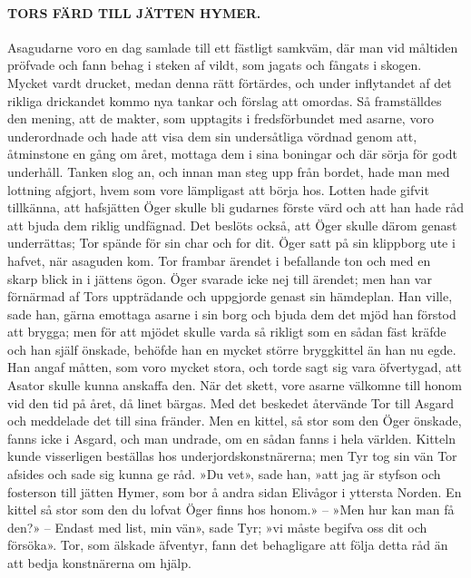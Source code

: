 \paragraph{TORS FÄRD TILL JÄTTEN HYMER.}

Asagudarne voro en dag samlade till ett fästligt samkväm, där man vid
måltiden pröfvade och fann behag i steken af vildt, som jagats och
fångats i skogen. Mycket vardt drucket, medan denna rätt förtärdes, och
under inflytandet af det rikliga drickandet kommo nya tankar och förslag
att omordas. Så framställdes den mening, att de makter, som upptagits i
fredsförbundet med asarne, voro underordnade och hade att visa dem sin
undersåtliga vördnad genom att, åtminstone en gång om året, mottaga dem
i sina boningar och där sörja för godt underhåll. Tanken slog an, och
innan man steg upp från bordet, hade man med lottning afgjort, hvem som
vore lämpligast att börja hos. Lotten hade gifvit tillkänna, att
hafsjätten Öger skulle bli gudarnes förste värd och att han hade råd att
bjuda dem riklig undfägnad. Det beslöts också, att Öger skulle därom
genast underrättas; Tor spände för sin char och for dit. Öger satt på
sin klippborg ute i hafvet, när asaguden kom. Tor frambar ärendet i
befallande ton och med en skarp blick in i jättens ögon. Öger svarade
icke nej till ärendet; men han var förnärmad af Tors uppträdande och
uppgjorde genast sin hämdeplan. Han ville, sade han, gärna emottaga
asarne i sin borg och bjuda dem det mjöd han förstod att brygga; men för
att mjödet skulle varda så rikligt som en sådan fäst kräfde och han
själf önskade, behöfde han en mycket större bryggkittel än han nu egde.
Han angaf måtten, som voro mycket stora, och torde sagt sig vara
öfvertygad, att Asator skulle kunna anskaffa den. När det skett, vore
asarne välkomne till honom vid den tid på året, då linet bärgas. Med det
beskedet återvände Tor till Asgard och meddelade det till sina fränder.
Men en kittel, så stor som den Öger önskade, fanns icke i Asgard, och
man undrade, om en sådan fanns i hela världen. Kitteln kunde visserligen
beställas hos underjordskonstnärerna;
\protect\hypertarget{lb1625905.xhtmlux5cux23start47}{}{}\protect\hypertarget{lb1625905.xhtmlux5cux23start47-a}{}{}\protect\hypertarget{lb1625905.xhtmlux5cux23start47-b}{}{}\protect\hypertarget{lb1625905.xhtmlux5cux23start47-c}{}{}\protect\hypertarget{lb1625905.xhtmlux5cux23start47-d}{}{}
men Tyr tog sin vän Tor afsides och sade sig kunna ge råd. »Du vet»,
sade han, »att jag är styfson och fosterson till jätten Hymer, som bor å
andra sidan Elivågor i yttersta Norden. En kittel så stor som den du
lofvat Öger finns hos honom.» -- »Men hur kan man få den?» -- Endast med
list, min vän», sade Tyr; »vi måste begifva oss dit och försöka». Tor,
som älskade äfventyr, fann det behagligare att följa detta råd än att
bedja konstnärerna om hjälp.

